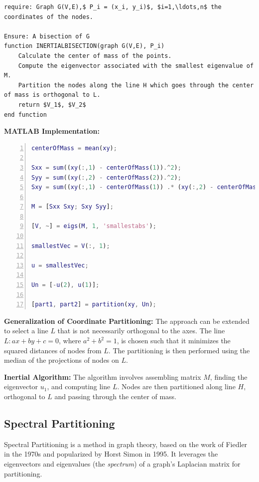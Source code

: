 \documentclass[unicode,11pt,a4paper,oneside,numbers=endperiod,openany]{scrartcl}
\begin{document}
\lstset{mathescape=true} %

\begin{lstlisting}
require: Graph G(V,E),$ P_i = (x_i, y_i)$, $i=1,\ldots,n$ the coordinates of the nodes.

Ensure: A bisection of G
function INERTIALBISECTION(graph G(V,E), P_i)
    Calculate the center of mass of the points.
    Compute the eigenvector associated with the smallest eigenvalue of M.
    Partition the nodes along the line H which goes through the center of mass is orthogonal to L.
    return $V_1$, $V_2$
end function
\end{lstlisting}



\textbf{MATLAB Implementation:}
\begin{lstlisting}[language=Matlab, numbers=left]
centerOfMass = mean(xy);

Sxx = sum((xy(:,1) - centerOfMass(1)).^2);
Syy = sum((xy(:,2) - centerOfMass(2)).^2);
Sxy = sum((xy(:,1) - centerOfMass(1)) .* (xy(:,2) - centerOfMass(2)));

M = [Sxx Sxy; Sxy Syy];

[V, ~] = eigs(M, 1, 'smallestabs');

smallestVec = V(:, 1);

u = smallestVec;

Un = [-u(2), u(1)];

[part1, part2] = partition(xy, Un);
\end{lstlisting}

\textbf{Generalization of Coordinate Partitioning:}
The approach can be extended to select a line \( L \) that is not necessarily orthogonal to the axes. The line \( L: ax + by + c = 0 \), where \( a^2 + b^2 = 1 \), is chosen such that it minimizes the squared distances of nodes from \( L \). The partitioning is then performed using the median of the projections of nodes on \( L \).

\textbf{Inertial Algorithm:}
The algorithm involves assembling matrix \( M \), finding the eigenvector \( u_1 \), and computing line \( L \). Nodes are then partitioned along line \( H \), orthogonal to \( L \) and passing through the center of mass.

\subsection{Spectral Partitioning}

Spectral Partitioning is a method in graph theory, based on the work of Fiedler in the 1970s and popularized by Horst Simon in 1995. It leverages the eigenvectors and eigenvalues (the \textit{spectrum}) of a graph's Laplacian matrix for partitioning.
\end{document}
